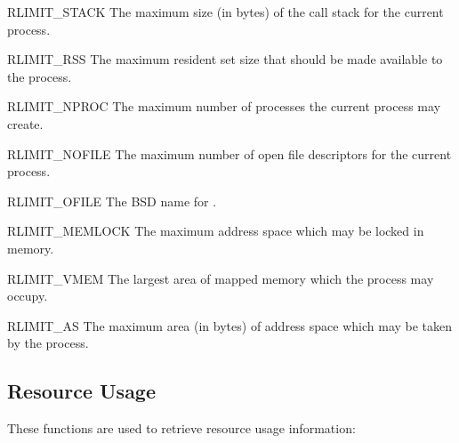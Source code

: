 \begin{datadesc}{RLIMIT_STACK}
  The maximum size (in bytes) of the call stack for the current
  process.
\end{datadesc}

\begin{datadesc}{RLIMIT_RSS}
  The maximum resident set size that should be made available to the
  process.
\end{datadesc}

\begin{datadesc}{RLIMIT_NPROC}
  The maximum number of processes the current process may create.
\end{datadesc}

\begin{datadesc}{RLIMIT_NOFILE}
  The maximum number of open file descriptors for the current
  process.
\end{datadesc}

\begin{datadesc}{RLIMIT_OFILE}
  The BSD name for .
\end{datadesc}

\begin{datadesc}{RLIMIT_MEMLOCK}
  The maximum address space which may be locked in memory.
\end{datadesc}

\begin{datadesc}{RLIMIT_VMEM}
  The largest area of mapped memory which the process may occupy.
\end{datadesc}

\begin{datadesc}{RLIMIT_AS}
  The maximum area (in bytes) of address space which may be taken by
  the process.
\end{datadesc}

\subsection{Resource Usage}

These functions are used to retrieve resource usage information:


